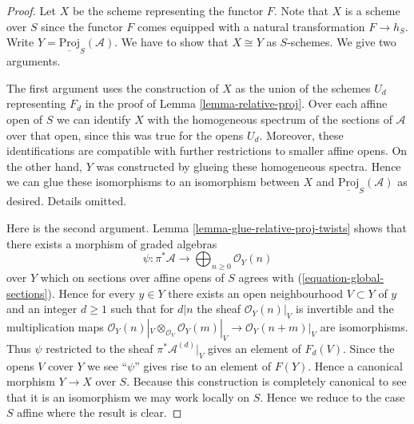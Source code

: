 \documentclass{stacks-project}
\theoremstyle{plain}
\theoremstyle{definition}
\theoremstyle{remark}
\numberwithin{equation}{subsection}
\begin{document}
\begin{proof}
Let $X$ be the scheme representing the functor $F$.
Note that $X$ is a scheme over $S$ since the functor $F$
comes equipped with a natural transformation $F \to h_S$.
Write $Y = \underline{\text{Proj}}_S(\mathcal{A})$.
We have to show that $X \cong Y$ as $S$-schemes.
We give two arguments.

\medskip\noindent
The first argument uses the construction of $X$ as the union
of the schemes $U_d$ representing $F_d$ in the
proof of Lemma \ref{lemma-relative-proj}.
Over each affine open of $S$ we can identify $X$ with the homogeneous spectrum
of the sections of $\mathcal{A}$ over that open, since this was
true for the opens $U_d$. Moreover, these identifications
are compatible with further restrictions to smaller affine opens.
On the other hand, $Y$ was constructed by glueing these
homogeneous spectra.
Hence we can glue these isomorphisms to an isomorphism
between $X$ and $\underline{\text{Proj}}_S(\mathcal{A})$ as
desired. Details omitted.

\medskip\noindent
Here is the second argument.
Lemma \ref{lemma-glue-relative-proj-twists}
shows that there exists a morphism of graded algebras
$$
\psi : \pi^*\mathcal{A}
\longrightarrow
\bigoplus\nolimits_{n \geq 0} \mathcal{O}_Y(n)
$$
over $Y$ which on sections over affine opens of $S$ agrees with
(\ref{equation-global-sections}). Hence for every $y \in Y$
there exists an open neighbourhood $V \subset Y$ of $y$
and an integer $d \geq 1$ such that for $d | n$ the sheaf
$\mathcal{O}_Y(n)|_V$ is invertible and the multiplication maps
$\mathcal{O}_Y(n)|_V \otimes_{\mathcal{O}_V} \mathcal{O}_Y(m)|_V
\to \mathcal{O}_Y(n + m)|_V$ are isomorphisms. Thus
$\psi$ restricted to the sheaf $\pi^*\mathcal{A}^{(d)}|_V$
gives an element of $F_d(V)$. Since the opens $V$ cover $Y$
we see ``$\psi$'' gives rise to an element of $F(Y)$.
Hence a canonical morphism $Y \to X$ over $S$.
Because this construction is completely canonical to see
that it is an isomorphism we may work locally on $S$.
Hence we reduce to the case $S$ affine where the result is clear.
\end{proof}
\end{document}
